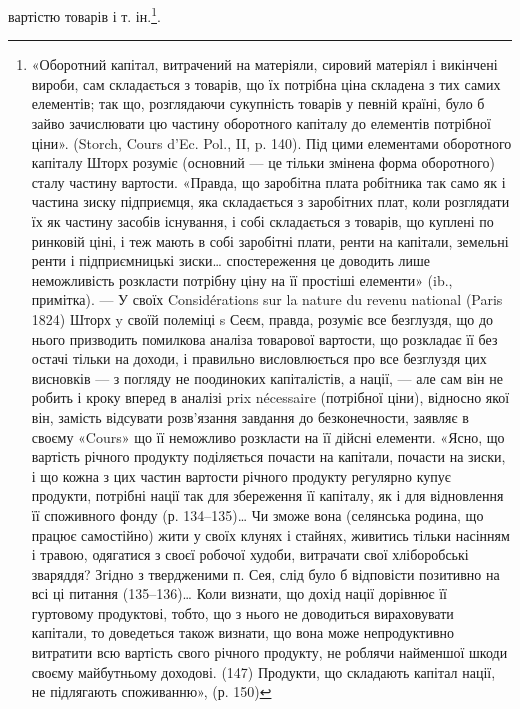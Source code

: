 вартістю товарів і т. ін.\footnote{
«Оборотний капітал, витрачений на матеріяли, сировий матеріял і викінчені вироби, сам
складається з товарів, що їх потрібна ціна складена з тих самих елементів; так що, розглядаючи
сукупність товарів у певній країні, було б зайво зачислювати цю частину оборотного капіталу до
елементів потрібної ціни». (Storch, Cours d’Ec. Pol., II, p. 140). Під цими елементами оборотного
капіталу Шторх розуміє (основний — це тільки змінена форма оборотного) сталу частину вартости.
«Правда, що заробітна плата робітника так само як і частина зиску підприємця, яка складається з
заробітних плат, коли розглядати їх як частину засобів існування, і собі складається з товарів, що
куплені по ринковій ціні, і теж мають в собі заробітні плати, ренти на капітали, земельні ренти і
підприємницькі зиски\dots{} спостереження це доводить лише неможливість розкласти потрібну ціну на її
простіші елементи» (ib., примітка). — У своїх Considérations sur la nature du revenu national (Paris
1824)
Шторх y своїй полеміці s Сеєм, правда, розуміє все безглуздя, що до нього призводить помилкова
аналіза товарової вартости, що розкладає її без остачі тільки на доходи, і правильно висловлюється
про все безглуздя цих висновків — з погляду не поодиноких капіталістів, а нації, — але сам він не
робить і кроку вперед в аналізі prix nécessaire (потрібної ціни), відносно якої він, замість
відсувати розв’язання
завдання до безконечности, заявляє в своєму «Cours» що її неможливо розкласти на її дійсні елементи.
«Ясно, що вартість річного продукту поділяється почасти на капітали, почасти на зиски, і що кожна з
цих частин вартости річного продукту регулярно купує продукти, потрібні нації так для збереження її
капіталу, як і для відновлення її споживного фонду (р. 134--135)\dots{} Чи зможе вона (селянська родина,
що працює самостійно) жити у своїх клунях і стайнях, живитись тільки насінням
і травою, одягатися з своєї робочої худоби, витрачати свої хліборобські зваряддя? Згідно з
твердженими п. Сея, слід було б відповісти позитивно на всі ці питання (135--136)\dots{} Коли визнати, що
дохід нації дорівнює її гуртовому продуктові, тобто, що з нього не доводиться вираховувати капітали,
то доведеться також визнати, що вона може непродуктивно витратити всю вартість свого річного
продукту,
не роблячи найменшої шкоди своєму майбутньому доходові. (147) Продукти, що складають капітал нації,
не підлягають споживанню», (р. 150)
}.

